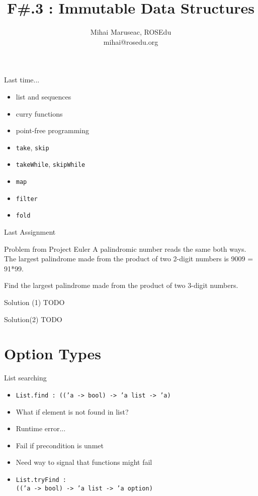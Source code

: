 \documentclass{beamer}
\title{F\#.3 : Immutable Data Structures}
\author{Mihai Maruseac, ROSEdu\\mihai@rosedu.org}
\begin{document}
\maketitle

\begin{frame}
  \tableofcontents
\end{frame}

\begin{frame}{Last time...}
  \begin{itemize}[<+->]
    \item list and sequences
    \item curry functions
    \item point-free programming
    \item \texttt{take}, \texttt{skip}
    \item \texttt{takeWhile}, \texttt{skipWhile}
    \item \texttt{map}
    \item \texttt{filter}
    \item \texttt{fold}
  \end{itemize}
\end{frame}

\begin{frame}{Last Assignment}
  \begin{block}{Problem from Project Euler}
  A palindromic number reads the same both ways. The largest palindrome made
  from the product of two 2-digit numbers is 9009 = 91*99.

  Find the largest palindrome made from the product of two 3-digit numbers.
  \end{block}
\end{frame}

\begin{frame}[fragile]{Solution (1)}
  TODO
\end{frame}

\begin{frame}[fragile]{Solution(2)}
  TODO
\end{frame}

\section{Option Types}
\frame{\tableofcontents[currentsection]}

\begin{frame}{List searching}
  \begin{itemize}[<+->]
    \item \texttt{List.find : (('a -> bool) -> 'a list -> 'a)}
    \item What if element is not found in list?
    \item Runtime error...
    \item Fail if precondition is unmet
    \item Need way to signal that functions might fail
    \item \texttt{List.tryFind :\\ (('a -> bool) -> 'a list -> 'a option)}
  \end{itemize}
\end{frame}
\end{document}

